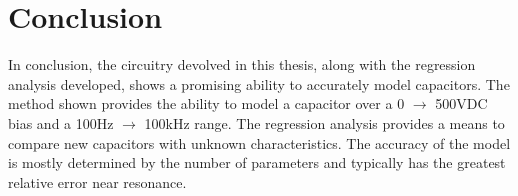 \section {Conclusion}

In conclusion, the circuitry devolved in this thesis, along with the regression analysis developed, shows a promising ability to accurately model capacitors. The method shown provides the ability to model a capacitor over a 0 $\rightarrow$ 500VDC bias and a 100Hz $\rightarrow$ 100kHz range. The regression analysis provides a means to compare new capacitors with unknown characteristics. The accuracy of the model is mostly determined by the number of parameters and typically has the greatest relative error near resonance.

